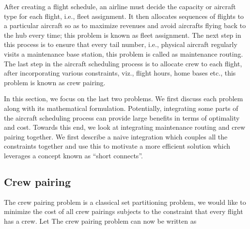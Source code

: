 \documentclass[letterpaper, 10pt, twocolumn, reqno]{amsart}
\begin{document}

After creating a flight schedule, an airline must decide the capacity or aircraft type for each flight, i.e., fleet assignment. It then allocates
sequences of flights to a particular aircraft so as to maximize revenues and
avoid aircrafts flying back to the hub every time; this problem is known as fleet assignment. The next step in this process is to ensure that every tail
number, i.e., physical aircraft regularly visits a maintenance base station, this problem is called as maintenance routing. The last step in the aircraft
scheduling process is to allocate crew to each flight, after incorporating various constraints, viz., flight hours, home bases etc., this problem is known as crew pairing.

In this section, we focus on the last two problems. We first discuss each problem along with its mathematical formulation. Potentially, integrating some parts of the aircraft scheduling process can provide large benefits in terms of optimality and cost. Towards this end, we look at integrating maintenance routing and crew pairing together. We first describe a naive integration which couples all the constraints together and use this to motivate a more efficient solution which leverages a concept known as ``short connects''.

\subsection{Crew pairing}
\label{ssec:crew_pairing}

The crew pairing problem is a classical set partitioning problem, we would like to minimize the cost of all crew pairings subjects to the constraint that every flight has a crew. Let
The crew pairing problem can now be written as
\end{document}
